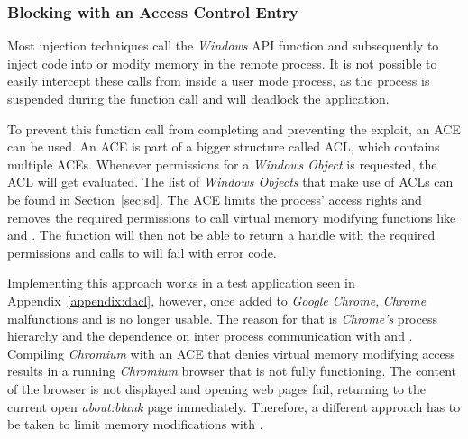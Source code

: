 \subsubsection{Blocking  with an Access Control Entry}
\label{sec:dacl}
Most injection techniques call the \emph{Windows} \gls{API} function  and subsequently  to inject code into or modify memory in the remote process. It is not possible to easily intercept these calls from inside a user mode process, as the process is suspended during the  function call and will deadlock the application.

\medskip

To prevent this function call from completing and preventing the exploit, an \gls{ACE} can be used. An \gls{ACE} is part of a bigger structure called \gls{ACL}, which contains multiple \glspl{ACE}. Whenever permissions for a \emph{Windows Object} is requested, the \gls{ACL} will get evaluated. The list of \emph{Windows Objects} that make use of \glspl{ACL} can be found in Section~\ref{sec:sd}. The \gls{ACE} limits the process' access rights and removes the required permissions to call virtual memory modifying functions like  and . The  function will then not be able to return a handle with the required permissions and calls to  will fail with  error code.

\medskip

Implementing this approach works in a test application seen in Appendix~\ref{appendix:dacl}, however, once added to \emph{Google Chrome}, \emph{Chrome} malfunctions and is no longer usable. The reason for that is \emph{Chrome's} process hierarchy and the dependence on inter process communication with  and . Compiling \emph{Chromium} with an \gls{ACE} that denies virtual memory modifying access results in a running \emph{Chromium} browser that is not fully functioning. The content of the browser is not displayed and opening web pages fail, returning to the current open \emph{about:blank} page immediately. Therefore, a different approach has to be taken to limit memory modifications with .